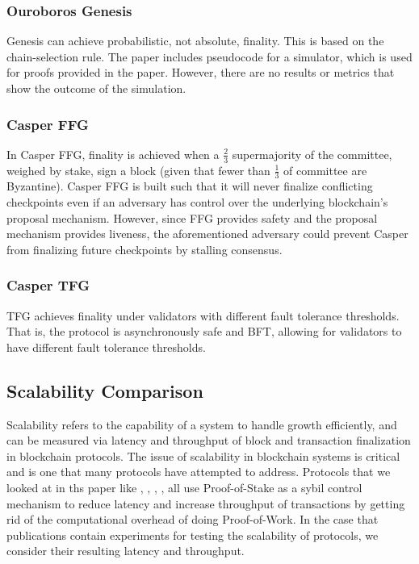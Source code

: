 \documentclass[10pt,journal,compsoc]{IEEEtran}
\begin{document}
\subsubsection{Ouroboros Genesis} Genesis can achieve probabilistic, not absolute, finality. This is based on the chain-selection rule. The paper includes pseudocode for a simulator, which is used for proofs provided in the paper. However, there are no results or metrics that show the outcome of the simulation. 

\subsubsection{Casper FFG} In Casper FFG, finality is achieved when a \(\frac{2}{3}\) supermajority of the committee, weighed by stake, sign a block (given that fewer than \(\frac{1}{3}\) of committee are Byzantine). Casper FFG is built such that it will never finalize conflicting checkpoints even if an adversary has control over the underlying blockchain's proposal mechanism. However, since FFG provides safety and the proposal mechanism provides liveness, the aforementioned adversary could prevent Casper from finalizing future checkpoints by stalling consensus.

\subsubsection{Casper TFG} TFG achieves finality under validators with different fault tolerance thresholds. That is, the protocol is asynchronously safe and BFT, allowing for validators to have different fault tolerance thresholds.

\subsection{Scalability Comparison}
Scalability refers to the capability of a system to handle growth efficiently, and can be measured via latency and throughput of block and transaction finalization in blockchain protocols. The issue of scalability in blockchain systems is critical and is one that many protocols have attempted to address. Protocols that we looked at in ths paper like \cite{TFG}, \cite{FFG}, \cite{Dfinity}, \cite{Gilad}, \cite{SnowWhite} all use Proof-of-Stake as a sybil control mechanism to reduce latency and increase throughput of transactions by getting rid of the computational overhead of doing Proof-of-Work. In the case that publications contain experiments for testing the scalability of protocols, we consider their resulting latency and throughput. 
\end{document}
